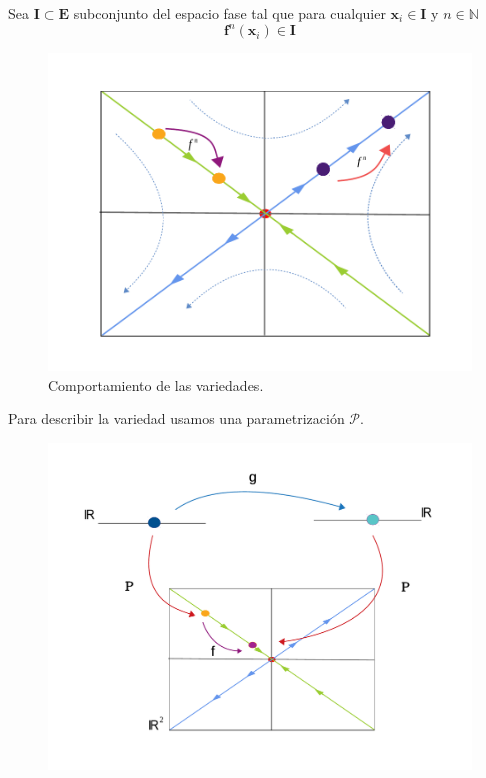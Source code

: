 \documentclass[11pt]{beamer}
\theoremstyle{definition}
\begin{document}
\begin{frame}
\begin{definition}
Sea  $\mathbf{I} \subset \mathbf{E}$ subconjunto del espacio fase tal que para cualquier $\mathbf{x}_{i}\in  \mathbf{I}$  y $ n\in\mathbb{N}$ 
\begin{equation}
\mathbf{f}^{n}(\mathbf{x}_{i}) \in \mathbf{I}
\end{equation}
\end{definition}
\begin{figure}
\includegraphics[scale=0.43]{hyperbolic2A.pdf}
\caption{Comportamiento de las variedades.}
\end{figure}
\end{frame}
\begin{frame}
Para describir la variedad usamos una parametrizaci\'on $\mathcal{P}$.
\begin{figure}
\includegraphics[scale=0.35]{diagrama-c2.pdf}
\end{figure}
\end{frame}
\end{document}
